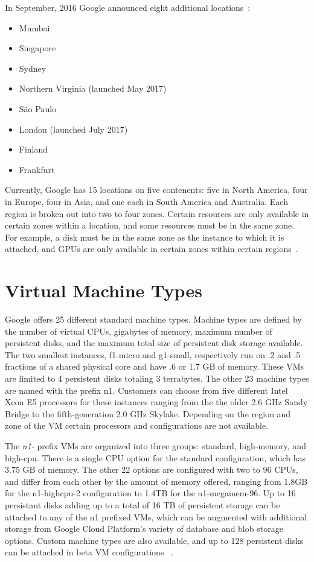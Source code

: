 In September, 2016 Google announced eight additional
locations~\cite{hid-sp18-419-gcp-history-medium}:
\begin{itemize}
  \item Mumbai
  \item Singapore
  \item Sydney
  \item Northern Virginia (launched May 2017)
  \item São Paulo
  \item London (launched July 2017)
  \item Finland
  \item Frankfurt
\end{itemize}

Currently, Google has 15 locations on five contenents: five in North
America, four in Europe, four in Asia, and one each in South America
and Australia. Each region is broken out into two to four
zones. Certain resources are only available in certain zones within a
location, and some resources must be in the same zone. For example, a
disk must be in the same zone as the instance to which it is attached,
and GPUs are only available in certain zones within certain
regions~\cite{hid-sp18-419-gce-regions-zones}.


\section{Virtual Machine Types}

Google offers 25 different standard machine types. Machine types are
defined by the number of virtual CPUs, gigabytes of memory, maximum
number of persistent disks, and the maximum total size of persistent
disk storage available. The two smallest instances, f1-micro and
g1-small, respectively run on .2 and .5 fractions of a shared physical
core and have .6 or 1.7 GB of memory. These VMs are limited to 4
persistent disks totaling 3 terrabytes. The other 23 machine types are
named with the prefix n1. Customers can choose from five different
Intel Xeon E5 processors for these instances ranging from the the
older 2.6 GHz Sandy Bridge to the fifth-generation 2.0 GHz
Skylake. Depending on the region and zone of the VM certain processors
and configurations are not available.

The \textit{n1-} prefix VMs are organized into three groups: standard,
high-memory, and high-cpu. There is a single CPU option for the
standard configuration, which has 3.75 GB of memory. The other 22
options are configured with two to 96 CPUs, and differ from each other
by the amount of memory offered, ranging from 1.8GB for the
n1-highcpu-2 configuration to 1.4TB for the n1-megamem-96. Up to 16
persistant disks adding up to a total of 16 TB of persistent storage
can be attached to any of the n1 prefixed VMs, which can be augmented
with additional storage from Google Cloud Platform's variety of
database and blob storage options. Custom machine types are also
available, and up to 128 persistent disks can be attached in beta VM
configurations ~\cite{hid-sp18-419-gce-machine-types}.

